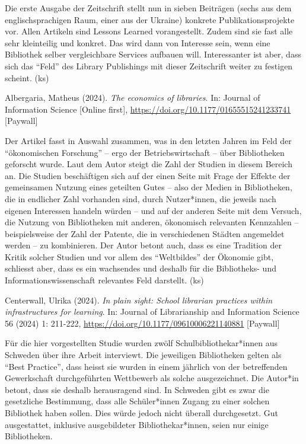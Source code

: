 \documentclass[a4paper,
fontsize=11pt,
oneside,
numbers=noperiodatend,
parskip=half-,
bibliography=totoc,
final
]{scrartcl}
\begin{document}
Die erste Ausgabe der Zeitschrift stellt nun in sieben Beiträgen (sechs
aus dem englischsprachigen Raum, einer aus der Ukraine) konkrete
Publikationsprojekte vor. Allen Artikeln sind Lessons Learned
vorangestellt. Zudem sind sie fast alle sehr kleinteilig und konkret.
Das wird dann von Interesse sein, wenn eine Bibliothek selber
vergleichbare Services aufbauen will. Interessanter ist aber, dass sich
das \enquote{Feld} des Library Publishings mit dieser Zeitschrift weiter
zu festigen scheint. (ks)

Albergaria, Matheus (2024). \emph{The economics of libraries}. In:
Journal of Information Science {[}Online first{]},
\url{https://doi.org/10.1177/01655515241233741} {[}Paywall{]}

Der Artikel fasst in Auswahl zusammen, was in den letzten Jahren im Feld
der \enquote{ökonomischen Forschung} -- ergo der Betriebswirtschaft --
über Bibliotheken geforscht wurde. Laut dem Autor steigt die Zahl der
Studien in diesem Bereich an. Die Studien beschäftigen sich auf der
einen Seite mit Frage der Effekte der gemeinsamen Nutzung eines
geteilten Gutes -- also der Medien in Bibliotheken, die in endlicher
Zahl vorhanden sind, durch Nutzer*innen, die jeweils nach eigenen
Interessen handeln würden -- und auf der anderen Seite mit dem Versuch,
die Nutzung von Bibliotheken mit anderen, ökonomisch relevanten
Kennzahlen -- beispielsweise der Zahl der Patente, die in verschiedenen
Städten angemeldet werden -- zu kombinieren. Der Autor betont auch, dass
es eine Tradition der Kritik solcher Studien und vor allem des
\enquote{Weltbildes} der Ökonomie gibt, schliesst aber, dass es ein
wachsendes und deshalb für die Bibliotheks- und Informationswissenschaft
relevantes Feld darstellt. (ks)

Centerwall, Ulrika (2024). \emph{In plain sight: School librarian
practices within infrastructures for learning}. In: Journal of
Librarianship and Information Science 56 (2024) 1: 211-222,
\url{https://doi.org/10.1177/09610006221140881} {[}Paywall{]}

Für die hier vorgestellten Studie wurden zwölf Schulbibliothekar*innen
aus Schweden über ihre Arbeit interviewt. Die jeweiligen Bibliotheken
gelten als \enquote{Best Practice}, dass heisst sie wurden in einem
jährlich von der betreffenden Gewerkschaft durchgeführten Wettbewerb als
solche ausgezeichnet. Die Autor*in betont, dass sie deshalb herausragend
sind. In Schweden gibt es zwar die gesetzliche Bestimmung, dass alle
Schüler*innen Zugang zu einer solchen Bibliothek haben sollen. Dies
würde jedoch nicht überall durchgesetzt. Gut ausgestattet, inklusive
ausgebildeter Bibliothekar*innen, seien nur einige Bibliotheken.
\end{document}
